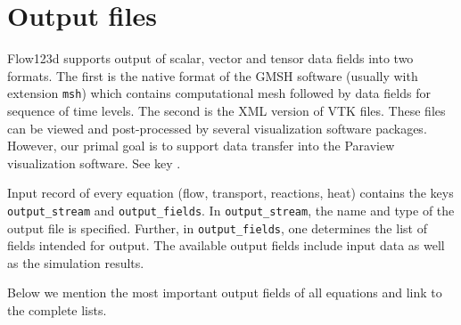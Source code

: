 %
%
%
%

\section{Output files}
\label{section_output}

Flow123d supports output of scalar, vector and tensor data fields into two formats. The first is the native format of the GMSH software (usually with extension \verb'msh')
which contains computational mesh followed by data fields for sequence of time levels. The second is the XML version of VTK files. These files can be 
viewed and post-processed by several visualization software packages. However, our primal goal is to support data transfer into the Paraview visualization software.
See key .

Input record of every equation (flow, transport, reactions, heat) contains the keys {\tt output\_stream} and {\tt output\_fields}.
In {\tt output\_stream}, the name and type of the output file is specified.
Further, in {\tt output\_fields}, one determines the list of fields intended for output.
The available output fields include input data as well as the simulation results.

Below we mention the most important output fields of all equations and link to the complete lists.

